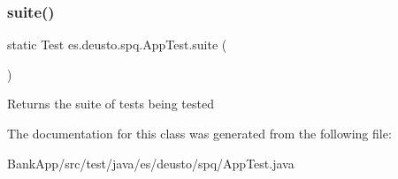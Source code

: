 \subsubsection{\texorpdfstring{suite()}{suite()}}
{\footnotesize\ttfamily static Test es.\+deusto.\+spq.\+App\+Test.\+suite (\begin{DoxyParamCaption}{ }\end{DoxyParamCaption})\hspace{0.3cm}{\ttfamily [static]}}

\begin{DoxyReturn}{Returns}
the suite of tests being tested 
\end{DoxyReturn}


The documentation for this class was generated from the following file\+:\begin{DoxyCompactItemize}
\item 
Bank\+App/src/test/java/es/deusto/spq/App\+Test.\+java\end{DoxyCompactItemize}
